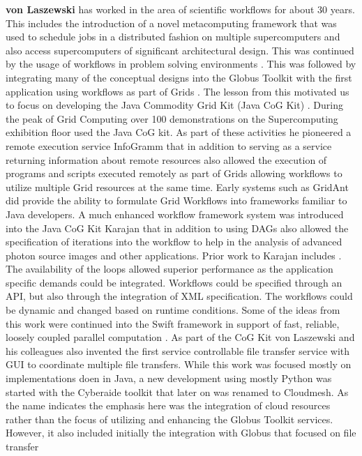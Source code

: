 \documentclass[utf8]{FrontiersinVancouver} %
\begin{document}
{\bf von Laszewski} has worked in the area of scientific workflows for about 30 years. This includes the introduction of a novel metacomputing framework \citep{las-99-loosely,las-94-ecwmf,las-96-ecwmf} that was used to schedule jobs in a distributed fashion on multiple supercomputers and also access supercomputers of significant architectural design. 
This was continued by the usage of workflows in problem solving environments \citep{las-01-pse}. This was followed by integrating many of the conceptual designs into the Globus Toolkit with the first application using workflows as part of Grids \citep{las-00-sbc}. The lesson from this motivated us to focus on developing the Java Commodity Grid Kit (Java CoG Kit) \citep{las-06-workcoordination,
las-06-workflow-book,
las-06-exp-a,
las-05-workflowrepo,
las-05-workflow-jgc,
las-05-exp,
las-04-abstraction-j,
las-03-gridcomputing,
las-02-javacog,
las-00-grande,
las-01-cog-concurency}. 
During the peak of Grid Computing over 100 demonstrations on the Supercomputing exhibition floor used the Java CoG kit. As part of these activities he pioneered a remote execution service InfoGramm 
\citep{las-02-infogram}
that in addition to serving as a service returning information about remote resources also allowed the execution of programs and scripts executed remotely as part of Grids allowing workflows to utilize multiple Grid resources at the same time. Early systems such as GridAnt \citep{las-04-gridant} 
did provide the ability to formulate Grid Workflows into frameworks familiar to Java developers. A much enhanced workflow framework system was introduced into the  Java CoG Kit Karajan \citep{las-06-workflow-book} that in addition to using DAGs also allowed the specification of iterations into the workflow to help in the analysis of advanced photon source images and other applications. Prior work to Karajan includes \citep{las-04-gridant,las-01-cog-concurency,las-96-ecwmf}. The availability of the loops allowed superior performance as the application specific demands could be integrated. Workflows could be specified through an API, but also through the integration of XML specification. The workflows could be dynamic and changed based on runtime conditions. Some of the ideas from this work were continued into the Swift framework in support of fast, reliable, loosely coupled parallel computation \citep{las--7-swift}. 
As part of the CoG Kit von Laszewski and his colleagues also invented the first service controllable file transfer service with GUI to coordinate multiple file transfers. While this work was focused mostly on implementations doen in Java, a new development using mostly Python was started with the Cyberaide toolkit \citep{las-09-ccgrid} that later on was renamed to Cloudmesh. As the name indicates the emphasis here was the integration of cloud resources rather than the focus of utilizing and enhancing the Globus Toolkit services. However, it also included initially the integration with Globus that focused on file transfer 
\end{document}
